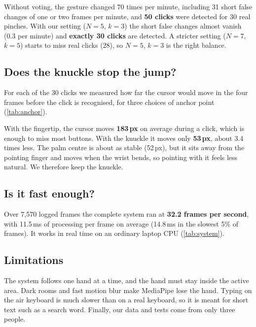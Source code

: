 

Without voting, the gesture changed 70 times per minute, including 31 short
false changes of one or two frames per minute, and \textbf{50 clicks} were
detected for 30 real pinches. With our setting ($N=5$, $k=3$) the short false
changes almost vanish (0.3 per minute) and \textbf{exactly 30 clicks} are
detected. A stricter setting ($N=7$, $k=5$) starts to miss real clicks (28),
so $N=5$, $k=3$ is the right balance.

\subsection{Does the knuckle stop the jump?}
For each of the 30 clicks we measured how far the cursor would move in the
four frames before the click is recognised, for three choices of anchor point
(\cref{tab:anchor}).



With the fingertip, the cursor moves \textbf{183\,px} on average during a
click, which is enough to miss most buttons. With the knuckle it moves only
\textbf{53\,px}, about 3.4 times less. The palm centre is about as stable
(52\,px), but it sits away from the pointing finger and moves when the wrist
bends, so pointing with it feels less natural. We therefore keep the knuckle.

\subsection{Is it fast enough?}
Over 7,570 logged frames the complete system ran at \textbf{32.2 frames per
second}, with 11.5\,ms of processing per frame on average (14.8\,ms in the
slowest 5\% of frames). It works in real time on an ordinary laptop CPU
(\cref{tab:system}).



\subsection{Limitations}
The system follows one hand at a time, and the hand must stay inside the
active area. Dark rooms and fast motion blur make MediaPipe lose the hand.
Typing on the air keyboard is much slower than on a real keyboard, so it is
meant for short text such as a search word. Finally, our data and tests come
from only three people.
